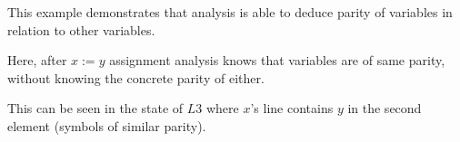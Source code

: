 This example demonstrates that analysis is able to deduce parity of
variables in relation to other variables.

Here, after $x := y$ assignment analysis knows that variables are of
same parity, without knowing the concrete parity of either.

This can be seen in the state of $L3$ where $x$'s line contains $y$
in the second element (symbols of similar parity).
